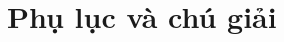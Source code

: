 \documentclass{report}
\begin{document}
\chapter{Phụ lục và chú giải}

% 

% 

% 

% 

% 

% 

% 

\citation{}

\end{document}
